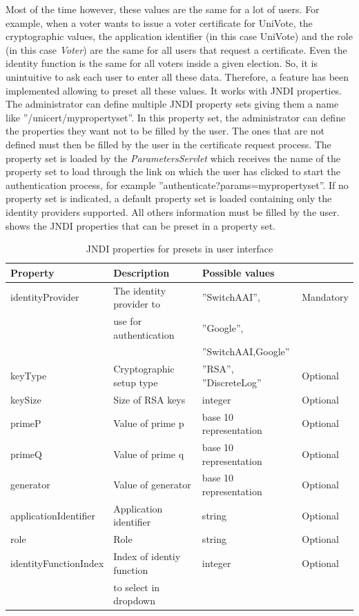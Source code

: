 \documentclass[oneside]{scrreprt}
\newcommand{\univote}{\mbox{UniVote}}
\begin{document}
Most of the time however, these values are the same for a lot of users. For example, when a voter wants to issue a voter certificate for \univote, the cryptographic values, the application identifier (in this case \univote) and the role (in this case \textit{Voter}) are the same for all users that request a certificate. Even the identity function is the same for all voters inside a given election. So, it is unintuitive to ask each user to enter all these data. Therefore, a feature has been implemented allowing to preset all these values. It works with JNDI properties. The administrator can define multiple JNDI property sets giving them a name like ''/unicert/mypropertyset''. In this property set, the administrator can define the properties they want not to be filled by the user. The ones that are not defined must then be filled by the user in the certificate request process. The property set is loaded by the \textit{ParametersServlet} which receives the name of the property set to load through the link on which the user has clicked to start the authentication process, for example ''authenticate?params=mypropertyset''. If no property set is indicated, a default property set is loaded containing only the identity providers supported. All others information must be filled by the user.  shows the JNDI properties that can be preset in a property set.

\begin{table}[ht]

\centering
\begin{tabular}{|l|l|l|l|}
  \hline
  Property & Description & Possible values & \\
  \hline
  identityProvider & The identity provider to & ''SwitchAAI'', & Mandatory\\ & use for authentication & ''Google'', & \\ & & ''SwitchAAI,Google'' & \\
  keyType & Cryptographic setup type & ''RSA'', ''DiscreteLog'' & Optional\\
  keySize & Size of RSA keys & integer & Optional\\
  primeP & Value of prime p & base 10 representation & Optional\\
  primeQ & Value of prime q & base 10 representation & Optional\\
  generator & Value of generator & base 10 representation & Optional\\
  applicationIdentifier & Application identifier & string & Optional\\
  role & Role & string & Optional\\
  identityFunctionIndex & Index of identiy function & integer & Optional\\
  & to select in dropdown & & \\
  \hline
\end{tabular}
\caption{JNDI properties for presets in user interface}
\label{t:jndi2}
\end{table}


 
\end{document}
